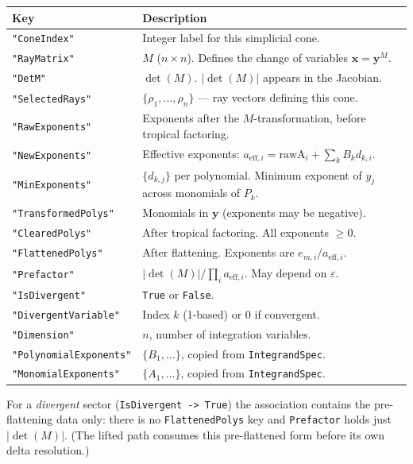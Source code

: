 \documentclass[11pt,a4paper]{article}
\begin{document}
\begin{center}
\begin{tabular}{lp{9cm}}
\toprule
\textbf{Key} & \textbf{Description} \\
\midrule
\texttt{"ConeIndex"} & Integer label for this simplicial cone. \\
\texttt{"RayMatrix"} & $M$ ($n \times n$). Defines the change of variables $\mathbf{x} = \mathbf{y}^M$. \\
\texttt{"DetM"} & $\det(M)$. $|\det(M)|$ appears in the Jacobian. \\
\texttt{"SelectedRays"} & $\{\rho_1, \ldots, \rho_n\}$ --- ray vectors defining this cone. \\
\texttt{"RawExponents"} & Exponents after the $M$-transformation, before tropical factoring. \\
\texttt{"NewExponents"} & Effective exponents: $a_{\mathrm{eff},i} = \mathrm{rawA}_i + \sum_k B_k d_{k,i}$. \\
\texttt{"MinExponents"} & $\{d_{k,j}\}$ per polynomial. Minimum exponent of $y_j$ across monomials of $P_k$. \\
\texttt{"TransformedPolys"} & Monomials in $\mathbf{y}$ (exponents may be negative). \\
\texttt{"ClearedPolys"} & After tropical factoring. All exponents $\geq 0$. \\
\texttt{"FlattenedPolys"} & After flattening. Exponents are $e_{m,i}/a_{\mathrm{eff},i}$. \\
\texttt{"Prefactor"} & $|\det(M)|/\prod_i a_{\mathrm{eff},i}$. May depend on $\varepsilon$. \\
\texttt{"IsDivergent"} & \texttt{True} or \texttt{False}. \\
\texttt{"DivergentVariable"} & Index $k$ (1-based) or 0 if convergent. \\
\texttt{"Dimension"} & $n$, number of integration variables. \\
\texttt{"PolynomialExponents"} & $\{B_1, \ldots\}$, copied from \texttt{IntegrandSpec}. \\
\texttt{"MonomialExponents"} & $\{A_1, \ldots\}$, copied from \texttt{IntegrandSpec}. \\
\bottomrule
\end{tabular}
\end{center}

For a \emph{divergent} sector (\texttt{IsDivergent -> True}) the association
contains the pre-flattening data only: there is no \texttt{FlattenedPolys}
key and \texttt{Prefactor} holds just $|\det(M)|$. (The lifted path consumes
this pre-flattened form before its own delta resolution.)
\end{document}
